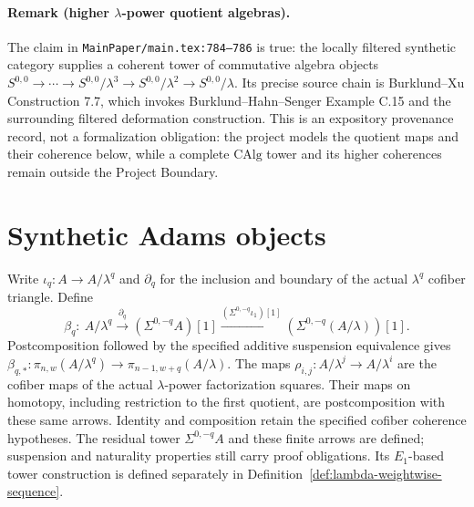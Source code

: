 \paragraph{Remark (higher $\lambda$-power quotient algebras).}
The claim in \texttt{MainPaper/main.tex:784--786} is true: the locally filtered
synthetic category supplies a coherent tower of commutative algebra objects
$S^{0,0}\to\cdots\to S^{0,0}/\lambda^3\to S^{0,0}/\lambda^2\to
S^{0,0}/\lambda$.  Its precise source chain is Burklund--Xu Construction 7.7,
which invokes Burklund--Hahn--Senger Example C.15 and the surrounding filtered
deformation construction.  This is an expository provenance record, not a
formalization obligation: the project models the quotient maps and their
coherence below, while a complete $\mathrm{CAlg}$ tower and its higher
coherences remain outside the Project Boundary.

\section{Synthetic Adams objects}

\begin{definition}
  \label{def:finite-lambda-bockstein-maps}
  \notready
  Write $\iota_q:A\to A/\lambda^q$ and $\partial_q$ for the inclusion and
  boundary of the actual $\lambda^q$ cofiber triangle. Define
  \[
    \beta_q:\ A/\lambda^q\xrightarrow{\partial_q}
       (\Sigma^{0,-q}A)[1]
       \xrightarrow{(\Sigma^{0,-q}\iota_1)[1]}
       (\Sigma^{0,-q}(A/\lambda))[1].
  \]
  Postcomposition followed by the specified additive suspension equivalence
  gives
  $\beta_{q,*}:\pi_{n,w}(A/\lambda^q)\to
    \pi_{n-1,w+q}(A/\lambda)$.
  The maps $\rho_{i,j}:A/\lambda^j\to A/\lambda^i$ are the cofiber maps
  of the actual $\lambda$-power factorization squares. Their maps on homotopy,
  including restriction to the first quotient, are postcomposition with
  these same arrows. Identity and composition retain the specified cofiber
  coherence hypotheses.
  The residual tower $\Sigma^{0,-q}A$ and these finite arrows are defined;
  suspension and naturality properties still carry proof obligations.
  Its $E_1$-based tower construction is defined separately in
  Definition~\ref{def:lambda-weightwise-sequence}.
\end{definition}

